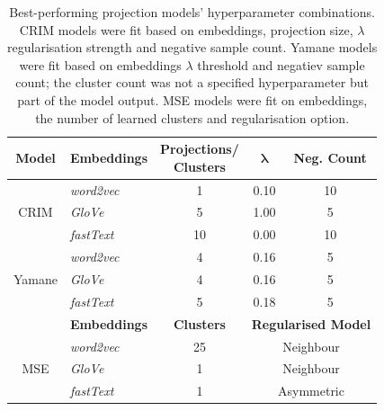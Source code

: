 \begin{table}\centering
    \begin{tabular}{@{}clccc@{}} \toprule
    \textbf{Model} & \textbf{Embeddings} & \shortstack{\textbf{Projections/}\\\textbf{Clusters}} & $\bm{\lambda}$ & \textbf{Neg. Count} \\ \midrule
    \multirow{3}{*}{CRIM} & \textit{word2vec} & 1 & 0.10 & 10 \\
    & \textit{GloVe} & 5 & 1.00 & 5\\
    & \textit{fastText} & 10 & 0.00 & 10\\ \cmidrule{2-5}
    \multirow{3}{*}{Yamane} & \textit{word2vec} & 4 & 0.16 & 5 \\
    & \textit{GloVe} & 4 & 0.16 & 5\\
    & \textit{fastText} & 5 & 0.18 & 5\\ \midrule
    & \textbf{Embeddings} & \textbf{Clusters} & \multicolumn{2}{c}{\textbf{Regularised Model}}\\ \cmidrule{2-5}
    \multirow{3}{*}{MSE} & \textit{word2vec} & 25 & \multicolumn{2}{c}{Neighbour} \\
    & \textit{GloVe} & 1 & \multicolumn{2}{c}{Neighbour} \\
    & \textit{fastText} & 1 & \multicolumn{2}{c}{Asymmetric} \\
    \bottomrule
    \end{tabular}
    \caption[Best-performing projection models' hyperparameter combinations.]{Best-performing projection models' hyperparameter combinations.  CRIM models were fit based on embeddings, projection size, $\lambda$ regularisation strength and negative sample count.  Yamane models were fit based on embeddings $\lambda$ threshold and negatiev sample count; the cluster count was not a specified hyperparameter but part of the model output.  MSE models were fit on embeddings, the number of learned clusters and regularisation option.}
    \label{tab:all_model_best_hyper}
\end{table}

